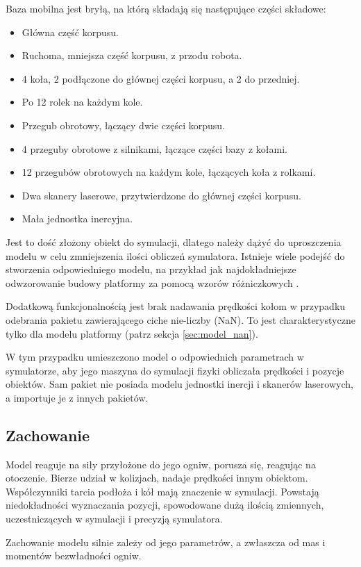 	Baza mobilna jest bryłą, na którą składają się następujące części składowe:
	\begin{itemize}
	\item Główna część korpusu.
	\item Ruchoma, mniejsza część korpusu, z przodu robota.
	\item 4 koła, 2 podłączone do głównej części korpusu, a 2 do przedniej.
	\item Po 12 rolek na każdym kole.
	\item Przegub obrotowy, łączący dwie części korpusu.
	\item 4 przeguby obrotowe z silnikami, łączące części bazy z kołami.
	\item 12 przegubów obrotowych na każdym kole, łączących koła z rolkami.
	\item Dwa skanery laserowe, przytwierdzone do głównej części korpusu.
	\item Mała jednostka inercyjna.
	\end{itemize}

	Jest to dość złożony obiekt do symulacji, dlatego należy dążyć do uproszczenia modelu w celu zmniejszenia ilości obliczeń symulatora.
	Istnieje wiele podejść do stworzenia odpowiedniego modelu, na przykład jak najdokładniejsze odwzorowanie budowy platformy 
	za pomocą wzorów różniczkowych \cite{braking} \cite{modelling_ways}.
	
	Dodatkową funkcjonalnością jest brak nadawania prędkości kołom w przypadku odebrania pakietu zawierającego ciche nie-liczby (NaN).
	To jest charakterystyczne tylko dla modelu platformy (patrz sekcja \ref{sec:model_nan}).
	
	W tym przypadku umieszczono model o odpowiednich parametrach w symulatorze, aby jego maszyna do symulacji fizyki obliczała prędkości i pozycje obiektów.
	Sam pakiet nie posiada modelu jednostki inercji i skanerów laserowych, a importuje je z innych pakietów.
	
	\subsection{Zachowanie}
		Model reaguje na siły przyłożone do jego ogniw, porusza się, reagując na otoczenie.
		Bierze udział w kolizjach, nadaje prędkości innym obiektom.
		Współczynniki tarcia podłoża i kół mają znaczenie w symulacji.
		Powstają niedokładności wyznaczania pozycji, spowodowane dużą ilością zmiennych, uczestniczących w symulacji i precyzją symulatora.
		
		Zachowanie modelu silnie zależy od jego parametrów, a zwłaszcza od mas i momentów bezwładności ogniw.
	
